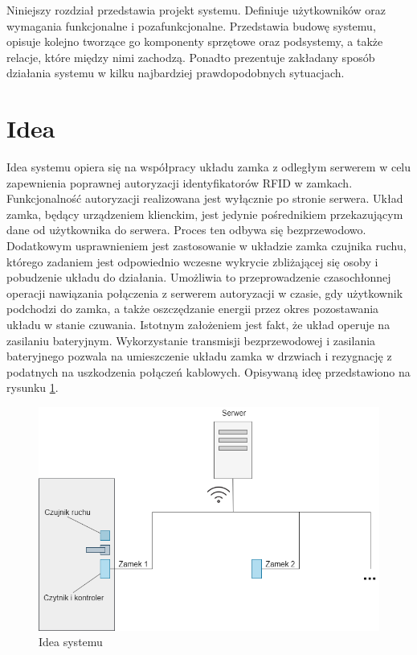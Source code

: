 \label{chap:hl-arch}

    Niniejszy rozdział przedstawia projekt systemu. Definiuje użytkowników oraz wymagania funkcjonalne i pozafunkcjonalne. Przedstawia budowę systemu, opisuje kolejno tworzące go komponenty sprzętowe oraz podsystemy, a także relacje, które między nimi zachodzą. Ponadto prezentuje zakładany sposób działania systemu w kilku najbardziej prawdopodobnych sytuacjach.

    \section{Idea}
        Idea systemu opiera się na współpracy układu zamka z odległym serwerem w celu zapewnienia poprawnej autoryzacji identyfikatorów RFID w zamkach. Funkcjonalność autoryzacji realizowana jest wyłącznie po stronie serwera. Układ zamka, będący urządzeniem klienckim, jest jedynie pośrednikiem przekazującym dane od użytkownika do serwera. Proces ten odbywa się bezprzewodowo. Dodatkowym usprawnieniem jest zastosowanie w układzie zamka czujnika ruchu, którego zadaniem jest odpowiednio wczesne wykrycie zbliżającej się osoby i pobudzenie układu do działania. Umożliwia to przeprowadzenie czasochłonnej operacji nawiązania połączenia z serwerem autoryzacji w czasie, gdy użytkownik podchodzi do zamka, a także oszczędzanie energii przez okres pozostawania układu w stanie czuwania. Istotnym założeniem jest fakt, że układ operuje na zasilaniu bateryjnym. Wykorzystanie transmisji bezprzewodowej i zasilania bateryjnego pozwala na umieszczenie układu zamka w drzwiach i rezygnację z podatnych na uszkodzenia połączeń kablowych. Opisywaną ideę przedstawiono na rysunku \ref{fig:door}.

        \begin{figure}[h!]
            \begin{center}
                \includegraphics[width=.8\linewidth]{chapters/images/door2.png}
                \caption{Idea systemu}
                \label{fig:door}
            \end{center}
        \end{figure}

